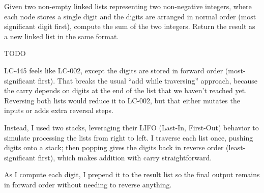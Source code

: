 %


\label{prob:lc-445-add-two-numbers-2}

\ProblemSummary
Given two non-empty linked lists representing two non-negative integers, where
each node stores a single digit and the digits are arranged in normal order
(most significant digit first), compute the sum of the two integers.
Return the result as a new linked list in the same format.

\KeyIdea
TODO

\begin{Thinking}
LC-445 feels like LC-002, except the digits are stored in forward order (most-significant first). 
That breaks the usual “add while traversing” approach, 
because the carry depends on digits at the end of the list that we haven’t reached yet. 
Reversing both lists would reduce it to LC-002, but that either mutates the inputs or adds extra reversal steps.

Instead, I used two stacks, leveraging their LIFO (Last-In, First-Out) behavior to simulate processing the lists from right to left. I traverse each list once, pushing digits onto a stack; then popping gives the 
digits back in reverse order (least-significant first), which makes addition with 
carry straightforward. 

As I compute each digit, I prepend it to the result list so the final output remains in forward order without needing to reverse anything.
\end{Thinking}

